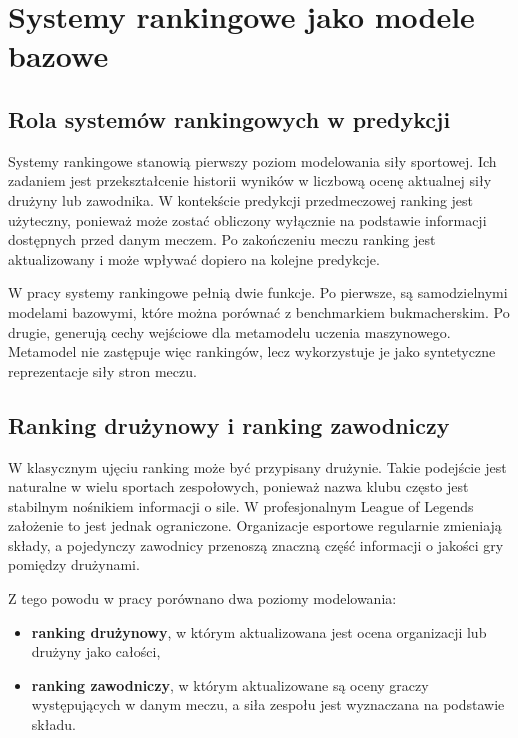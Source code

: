 \chapter{Systemy rankingowe jako modele bazowe}

\section{Rola systemów rankingowych w predykcji}

Systemy rankingowe stanowią pierwszy poziom modelowania siły sportowej. Ich zadaniem jest
przekształcenie historii wyników w liczbową ocenę aktualnej siły drużyny lub zawodnika. W kontekście
predykcji przedmeczowej ranking jest użyteczny, ponieważ może zostać obliczony wyłącznie na
podstawie informacji dostępnych przed danym meczem. Po zakończeniu meczu ranking jest aktualizowany
i może wpływać dopiero na kolejne predykcje.

W pracy systemy rankingowe pełnią dwie funkcje. Po pierwsze, są samodzielnymi modelami bazowymi,
które można porównać z benchmarkiem bukmacherskim. Po drugie, generują cechy wejściowe dla
metamodelu uczenia maszynowego. Metamodel nie zastępuje więc rankingów, lecz wykorzystuje je jako
syntetyczne reprezentacje siły stron meczu.

\section{Ranking drużynowy i ranking zawodniczy}

W klasycznym ujęciu ranking może być przypisany drużynie. Takie podejście jest naturalne w wielu
sportach zespołowych, ponieważ nazwa klubu często jest stabilnym nośnikiem informacji o sile. W
profesjonalnym League of Legends założenie to jest jednak ograniczone. Organizacje esportowe
regularnie zmieniają składy, a pojedynczy zawodnicy przenoszą znaczną część informacji o jakości gry
pomiędzy drużynami.

Z tego powodu w pracy porównano dwa poziomy modelowania:

\begin{itemize}
    \item \textbf{ranking drużynowy}, w którym aktualizowana jest ocena organizacji lub drużyny jako całości,
    \item \textbf{ranking zawodniczy}, w którym aktualizowane są oceny graczy występujących w danym meczu, a siła zespołu jest wyznaczana na podstawie składu.
\end{itemize}

